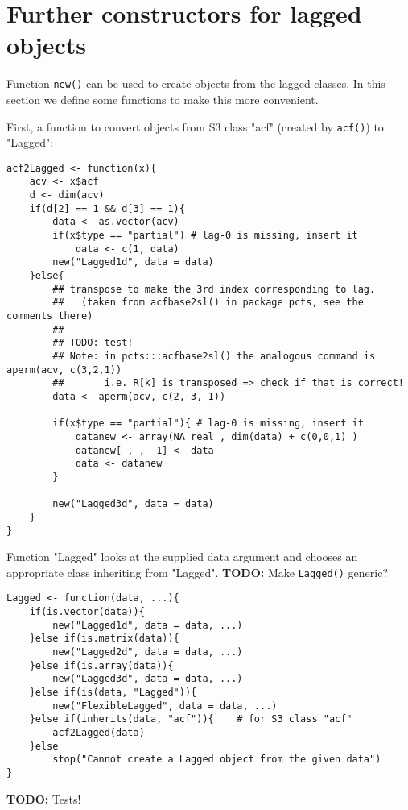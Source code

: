 \documentclass[11pt,a4paper]{article}
\begin{document}
\section{Further constructors for lagged objects}
\label{sec:org52539aa}

Function \texttt{new()} can be used to create objects from the lagged classes.
In this section we define some functions to make this more convenient.

First, a function to convert objects from S3 class "acf" (created by \texttt{acf()}) to "Lagged":
\begin{verbatim}
acf2Lagged <- function(x){
    acv <- x$acf
    d <- dim(acv)
    if(d[2] == 1 && d[3] == 1){
        data <- as.vector(acv)
        if(x$type == "partial") # lag-0 is missing, insert it
            data <- c(1, data)
        new("Lagged1d", data = data)
    }else{
        ## transpose to make the 3rd index corresponding to lag.
        ##   (taken from acfbase2sl() in package pcts, see the comments there)
        ##
        ## TODO: test!
        ## Note: in pcts:::acfbase2sl() the analogous command is aperm(acv, c(3,2,1))
        ##       i.e. R[k] is transposed => check if that is correct!
        data <- aperm(acv, c(2, 3, 1))

        if(x$type == "partial"){ # lag-0 is missing, insert it
            datanew <- array(NA_real_, dim(data) + c(0,0,1) )
            datanew[ , , -1] <- data
            data <- datanew
        }

        new("Lagged3d", data = data)
    }
}
\end{verbatim}


Function "Lagged" looks at the supplied data argument and chooses an appropriate class
inheriting from "Lagged". \textbf{TODO:} Make \texttt{Lagged()} generic?
\begin{verbatim}
Lagged <- function(data, ...){
    if(is.vector(data)){
        new("Lagged1d", data = data, ...)
    }else if(is.matrix(data)){
        new("Lagged2d", data = data, ...)
    }else if(is.array(data)){
        new("Lagged3d", data = data, ...)
    }else if(is(data, "Lagged")){
        new("FlexibleLagged", data = data, ...)
    }else if(inherits(data, "acf")){    # for S3 class "acf"
        acf2Lagged(data)
    }else
        stop("Cannot create a Lagged object from the given data")
}
\end{verbatim}

\textbf{TODO:} Tests!
\end{document}
